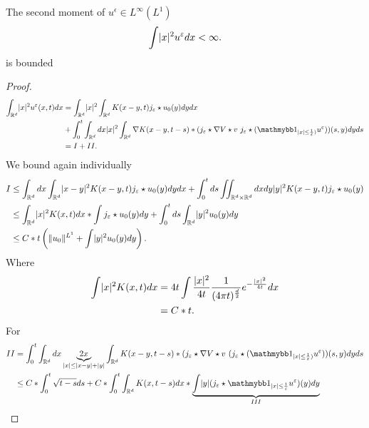    \begin{lemma}
   The second moment  of $u^{\epsilon} \in L^{\infty}(L^{1} ) $
   \begin{align*}
    \int  \lvert x\rvert^2 u^{\varepsilon}  dx < \infty
   .\end{align*}
   is bounded
   \end{lemma}
   \begin{proof}
   \begin{align*}
     \int_{\mathbb{R}^{d} } \abs{x}^2 u^{\epsilon}(x,t) dx &= \int_{\mathbb{R}^{d} } \abs{x}^2   \int_{\mathbb{R}^{d} } K(x-y,t)j_{\epsilon} \star u_{0}(y) dy dx\\
                                                           &+  \int_0^{t} \int_{\mathbb{R}^{d} } dx \abs{x}^2  \int_{\mathbb{R}^{d} } \nabla K(x-y,t-s) *(j_{\epsilon} \star \nabla V \star  v \ j_{\epsilon} \star  (\cha_{\abs{x} \le  \frac{1}{\epsilon})} u^{\epsilon} ))(s,y) dy ds \\
                                                           &= I + II
   .\end{align*} 
   We bound again individually 
   \begin{align*}
     I &\le \int_{\mathbb{R}^{d} } dx \int_{\mathbb{R}^{d} } \lvert x-y\rvert^2 K(x-y,t)  j_{\varepsilon} \star u_{0}(y) dy dx + \int_{0}^{t} ds \iint_{\mathbb{R}^{d} \times  \mathbb{R}^{d}  } dx dy \lvert y\rvert^2 K(x-y,t) j_{\varepsilon} \star u_{0}(y)\\
       &\le \int_{\mathbb{R}^{d} } \lvert x\rvert^2K(x,t) dx * \int  j_{\varepsilon} \star u_{0}(y) dy  +  \int_0^{t} ds \int_{\mathbb{R}^{d} }  \lvert y\rvert^2 u_0(y) dy\\
       &\le  C*t  \left(   \|u_0\|^{L^{1} } + \int \lvert y\rvert^2 u_0(y) dy\right)
   .\end{align*}
  Where 
  \begin{align*}
    \int \lvert x\rvert^2 K(x,t) dx &=  4t\int \frac{\lvert x\rvert^2}{4t} \frac{1}{(4\pi t)^{\frac{d}{2}} } e^{-\frac{\lvert x\rvert^2}{4t}}  dx\\
                             &=  C*t 
  .\end{align*}
  For 
  \begin{align*}
    II &= \int_0^{t} \int_{\mathbb{R}^{d} }  dx \underbrace{2x}_{\abs{x} \le \abs{x-y} + \abs{y}} \int_{\mathbb{R}^{d} } K(x-y,t-s) * (j_{\epsilon} \star \nabla V \star  v \ (j_{\epsilon} \star  (\cha_{\abs{x} \le  \frac{1}{\epsilon})} u^{\epsilon} ))(s,y) dy ds\\
       &\le C*\int_0^{t} \sqrt{t-s}  ds  + C * \int_0^{t}  \int_{\mathbb{R}^{d} }K(x,t-s) dx * \underbrace{\int \abs{y} (j_{\epsilon} \star \cha_{\abs{x}\le \frac{1}{\epsilon}} u^{\epsilon} )(y) dy}_{III}\\

\end{align*}
\end{proof}

